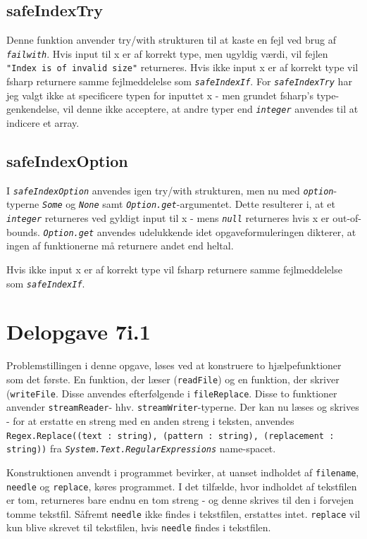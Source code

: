 \documentclass[a4paper,10pt]{article}
\begin{document}
\subsection{safeIndexTry}
Denne funktion anvender try/with strukturen til at kaste en fejl ved brug af \texttt{\textit{failwith}}. Hvis input til x er af korrekt type, men ugyldig værdi, vil fejlen \texttt{"Index is of invalid size"} returneres. Hvis ikke input x er af korrekt type vil fsharp returnere samme fejlmeddelelse som \texttt{\textit{safeIndexIf}}. For \texttt{\textit{safeIndexTry}} har jeg valgt ikke at specificere typen for inputtet x - men grundet fsharp's type-genkendelse, vil denne ikke acceptere, at andre typer end \texttt{\textit{integer}} anvendes til at indicere et array. 

\subsection{safeIndexOption}
I \texttt{\textit{safeIndexOption}} anvendes igen try/with strukturen, men nu med \texttt{\textit{option}}-typerne \texttt{\textit{Some}} og \texttt{\textit{None}} samt \texttt{\textit{Option.get}}-argumentet. Dette resulterer i, at et \texttt{\textit{integer}} returneres ved gyldigt input til x - mens \texttt{\textit{null}} returneres hvis x er out-of-bounds. \texttt{\textit{Option.get}} anvendes udelukkende idet opgaveformuleringen dikterer, at ingen af funktionerne må returnere andet end heltal. 

Hvis ikke input x er af korrekt type vil fsharp returnere samme fejlmeddelelse som \texttt{\textit{safeIndexIf}}.

\section{Delopgave 7i.1}
Problemstillingen i denne opgave, løses ved at konstruere to hjælpefunktioner som det første. En funktion, der læser (\texttt{readFile}) og en funktion, der skriver (\texttt{writeFile}. Disse anvendes efterfølgende i \texttt{fileReplace}. Disse to funktioner anvender \texttt{streamReader}- hhv. \texttt{streamWriter}-typerne. Der kan nu læses og skrives - for at erstatte en streng med en anden streng i teksten, anvendes \texttt{Regex.Replace((text : string), (pattern : string), (replacement : string))} fra \texttt{\textit{System.Text.RegularExpressions}} name-spacet.

Konstruktionen anvendt i programmet bevirker, at uanset indholdet af \texttt{filename}, \texttt{needle} og \texttt{replace}, køres programmet. I det tilfælde, hvor indholdet af tekstfilen er tom, returneres bare endnu en tom streng - og denne skrives til den i forvejen tomme tekstfil. Såfremt \texttt{needle} ikke findes i tekstfilen, erstattes intet. \texttt{replace} vil kun blive skrevet til tekstfilen, hvis \texttt{needle} findes i tekstfilen.
\end{document}
